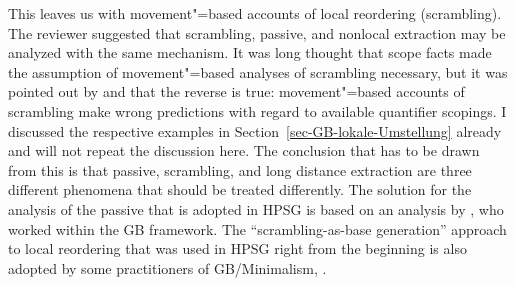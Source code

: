 This leaves us with movement"=based accounts of local reordering (scrambling). The reviewer
suggested that scrambling, passive, and nonlocal extraction may be analyzed with the same
mechanism. It was long thought that scope facts made the assumption of movement"=based analyses of
scrambling necessary, but it was pointed out by  and
 that the reverse is true: movement"=based accounts of scrambling
make wrong predictions with regard to available quantifier scopings. I discussed the respective
examples in Section~\ref{sec-GB-lokale-Umstellung} already and will not repeat the discussion
here. The conclusion that has to be drawn from this is that passive, scrambling, and long distance
extraction are three different phenomena that should be treated differently. The solution for the
analysis of the passive that is adopted in HPSG is based on an analysis by \citet{Haider86}, who
worked within the GB framework. The ``scrambling-as-base generation'' approach to local reordering
that was used in HPSG right from the beginning \citep{Gunji86a} is also adopted by some practitioners
of GB/Minimalism, \eg \citet{Fanselow2001a}.

